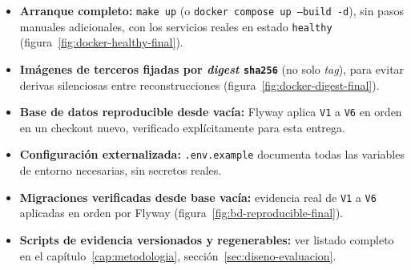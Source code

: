 \begin{itemize}[nosep]
  \item \textbf{Arranque completo:} \texttt{make up} (o \texttt{docker
    compose up --build -d}), sin pasos manuales adicionales, con los
    servicios reales en estado \texttt{healthy}
    (figura~\ref{fig:docker-healthy-final}).
  \item \textbf{Im\'agenes de terceros fijadas por \emph{digest}
    \texttt{sha256}} (no solo \emph{tag}), para evitar derivas silenciosas
    entre reconstrucciones (figura~\ref{fig:docker-digest-final}).
  \item \textbf{Base de datos reproducible desde vac\'ia:} Flyway aplica
    \texttt{V1} a \texttt{V6} en orden en un checkout nuevo, verificado
    expl\'icitamente para esta entrega.
  \item \textbf{Configuraci\'on externalizada:} \texttt{.env.example}
    documenta todas las variables de entorno necesarias, sin secretos
    reales.
  \item \textbf{Migraciones verificadas desde base vac\'ia:} evidencia real
    de \texttt{V1} a \texttt{V6} aplicadas en orden por Flyway
    (figura~\ref{fig:bd-reproducible-final}).
  \item \textbf{Scripts de evidencia versionados y regenerables:} ver
    listado completo en el cap\'itulo~\ref{cap:metodologia},
    secci\'on~\ref{sec:diseno-evaluacion}.
\end{itemize}
